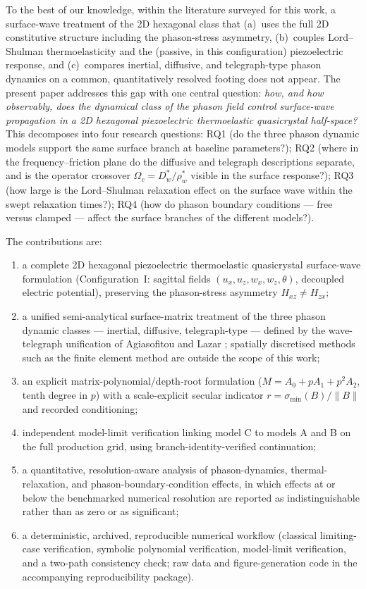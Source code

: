 \documentclass[11pt]{article}
\newcommand{\Om}{\Omega}
\newcommand{\tht}{\theta}
\newcommand{\Dw}{D_w}
\newcommand{\rw}{\rho_w}
\begin{document}
To the best of our knowledge, within the literature surveyed for this work, a surface-wave treatment of the 2D hexagonal class that (a)~uses the full 2D constitutive structure including the phason-stress asymmetry, (b)~couples Lord--Shulman thermoelasticity and the (passive, in this configuration) piezoelectric response, and (c)~compares inertial, diffusive, and telegraph-type phason dynamics on a common, quantitatively resolved footing does not appear. The present paper addresses this gap with one central question: \emph{how, and how observably, does the dynamical class of the phason field control surface-wave propagation in a 2D hexagonal piezoelectric thermoelastic quasicrystal half-space?} This decomposes into four research questions: RQ1 (do the three phason dynamic models support the same surface branch at baseline parameters?); RQ2 (where in the frequency--friction plane do the diffusive and telegraph descriptions separate, and is the operator crossover $\Om_c=\Dw^*/\rw^*$ visible in the surface response?); RQ3 (how large is the Lord--Shulman relaxation effect on the surface wave within the swept relaxation times?); RQ4 (how do phason boundary conditions --- free versus clamped --- affect the surface branches of the different models?).

The contributions are:
\begin{enumerate}
\item a complete 2D hexagonal piezoelectric thermoelastic quasicrystal surface-wave formulation (Configuration~I: sagittal fields $(u_x,u_z,w_x,w_z,\tht)$, decoupled electric potential), preserving the phason-stress asymmetry $H_{xz}\neq H_{zx}$;
\item a unified semi-analytical surface-matrix treatment of the three phason dynamic classes --- inertial, diffusive, telegraph-type --- defined by the wave-telegraph unification of Agiasofitou and Lazar \cite{agiasofitou2014}; spatially discretised methods such as the finite element method are outside the scope of this work;
\item an explicit matrix-polynomial/depth-root formulation ($M=A_0+pA_1+p^2A_2$, tenth degree in $p$) with a scale-explicit secular indicator $r=\sigma_{\min}(B)/\lVert B\rVert$ and recorded conditioning;
\item independent model-limit verification linking model C to models A and B on the full production grid, using branch-identity-verified continuation;
\item a quantitative, resolution-aware analysis of phason-dynamics, thermal-relaxation, and phason-boundary-condition effects, in which effects at or below the benchmarked numerical resolution are reported as indistinguishable rather than as zero or as significant;
\item a deterministic, archived, reproducible numerical workflow (classical limiting-case verification, symbolic polynomial verification, model-limit verification, and a two-path consistency check; raw data and figure-generation code in the accompanying reproducibility package).
\end{enumerate}
\end{document}

